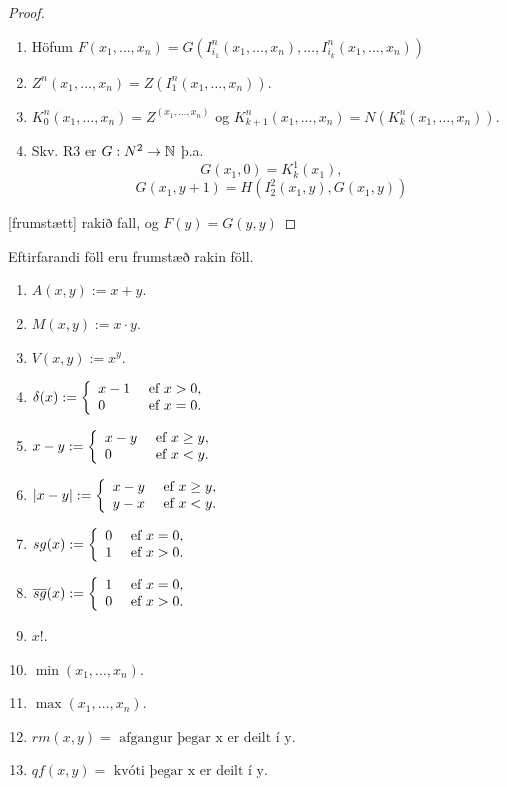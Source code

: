 \documentclass[12pt]{book}
\newcommand{\xxn}{x_1, \dotsc, x_n}
\begin{document}
\begin{proof}
  \begin{enumerate}[(1)]
  \item Höfum $F(\xxn) = G(I^n_{i_1} (\xxn), \dotsc, I^n_{i_k}(\xxn))$
  \item $Z^n(\xxn) = Z(I^n_1 ( \xxn ))$.
  \item $K^n_0 (\xxn) = Z^(\xxn)$ og
    $K^n_{k+1} (\xxn) = N(K^n_k (\xxn))$.
  \item Skv. R3 er $G: N^2 \to \mathbb{N}$ þ.a.
    \[ G(x_1, 0) = K^1_k (x_1), \]
    \[ G(x_1, y +1) = H(I^2_2 (x_1, y), G(x_1,y))\]
  \end{enumerate}
  [frumstætt] rakið fall, og $F(y) = G(y,y)$
\end{proof}


\begin{setn}[og skilgreining]
  Eftirfarandi föll eru frumstæð rakin föll.
  \begin{enumerate}[(1)]
  \item $A(x,y) := x+y$.
  \item $M(x,y) := x \cdot y$.
  \item $V(x,y) := x ^ y$.
  \item $ \delta (x) := \left\{ \begin{array}{l l} x-1 & \text{ ef } x > 0, \\ 0 & \text{ ef } x = 0. \end{array} \right.$
  \item $ x-y := \left\{ \begin{array}{l l} x-y & \text{ ef } x \geq y, \\ 0 & \text{ ef } x < y. \end{array} \right.$
  \item $ |x-y| := \left\{ \begin{array}{l l} x-y & \text{ ef } x \geq y, \\ y - x & \text{ ef } x < y. \end{array} \right.$
  \item $ sg(x) := \left\{ \begin{array}{l l} 0 & \text{ ef } x = 0 , \\ 1 & \text{ ef } x > 0. \end{array} \right.$
  \item $ \overline{sg}(x) := \left\{ \begin{array}{l l} 1 & \text{ ef } x = 0 , \\ 0 &  \text{ ef } x > 0. \end{array} \right.$
  \item $x!$.
  \item $\min(\xxn)$.
  \item $\max(\xxn)$.
  \item $rm(x,y) = \text{ afgangur þegar x er deilt í y}$.
  \item $qf(x,y) = \text{ kvóti þegar x er deilt í y}$.
  \end{enumerate}
\end{setn}
\end{document}
